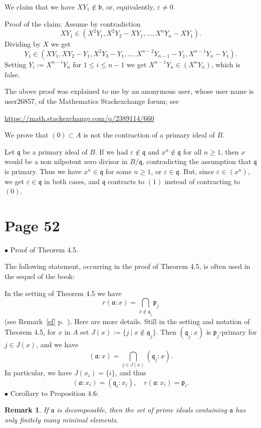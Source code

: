 \documentclass[parskip=half]{scrartcl}%
\newcommand{\mf}{\mathfrak}
\newcommand{\bu}{\bullet}
\newtheorem{rk}[thm]{Remark}
\begin{document}
We claim that we have $XY_1\notin\mathfrak b$, or, equivalently, $\varepsilon\ne0$.

Proof of the claim: Assume by contradiction 
$$
XY_1\in(X^2Y_1,X^2Y_2-XY_1,\dots,X^nY_n-XY_1).
$$ 
Dividing by $X$ we get 
$$
Y_1\in(XY_1,XY_2-Y_1,X^2Y_3-Y_1,\dots,X^{n-2}Y_{n-1}-Y_1,X^{n-1}Y_n-Y_1).
$$ 
Setting $Y_i:=X^{n-i}Y_n$ for $1\le i\le n-1$ we get $X^{n-1}Y_n\in(X^nY_n)$, which is false. 

The above proof was explained to me by an anonymous user, whose user name is user26857, of the Mathematics Stackexchange forum; see 

\href{https://math.stackexchange.com/q/2389114/660}{https://math.stackexchange.com/q/2389114/660}

We prove that $(0)\subset A$ is not the contraction of a primary ideal of $B$.

Let $\mathfrak q$ be a primary ideal of $B$. If we had $\varepsilon\notin\mathfrak q$ and $x^n\notin\mathfrak q$ for all $n\ge1$, then $x$ would be a non nilpotent zero divisor in $B/\mathfrak q$, contradicting the assumption that $\mathfrak q$ is primary. Thus we have $x^n\in\mathfrak q$ for some $n\ge1$, or $\varepsilon\in\mathfrak q$. But, since $\varepsilon\in(x^n)$, we get $\varepsilon\in\mathfrak q$ in both cases, and $\mathfrak q$ contracts to $(1)$ instead of contracting to $(0)$.

\section{Page 52}%

$\bu$ Proof of Theorem 4.5.

The following statement, occurring in the proof of Theorem 4.5, is often used in the sequel of the book:

In the setting of Theorem 4.5 we have 
$$
r(\mf a:x)=\bigcap_{x\notin\mf q_j}\mf p_j
$$
(see Remark~\ref{ef} p.~\pageref{ef}). Here are more details. Still in the setting and notation of Theorem 4.5, for $x$ in $A$ set $J(x):=\{j\ |\ x\notin\mf q_j\}$. Then $(\mf q_j:x)$ is $\mf p_j$-primary for $j\in J(x)$, and we have 
$$
(\mf a:x)=\bigcap_{j\in J(x)}(\mf q_j:x).
$$ 
In particular, we have $J(x_i)=\{i\}$, and thus 
$$
(\mf a:x_i)=(\mf q_i:x_i),\quad r(\mf a:x_i)=\mf p_i.
$$
$\bu$ Corollary to Proposition 4.6:

\begin{rk}\label{fmme}
If $\mf a$ is decomposable, then the set of prime ideals containing $\mf a$ has only finitely many minimal elements.
\end{rk}
\end{document}

